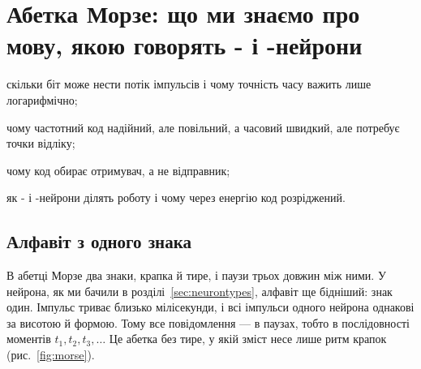 \chapter{Абетка Морзе: що ми знаємо про мову, якою говорять - і -нейрони}
\label{sec:code}
\begin{chaptergoals}
\item скільки біт може нести потік імпульсів і чому точність часу важить лише логарифмічно;
\item чому частотний код надійний, але повільний, а часовий швидкий, але потребує точки відліку;
\item чому код обирає отримувач, а не відправник;
\item як - і -нейрони ділять роботу і чому через енергію код розріджений.
\end{chaptergoals}

\section{Алфавіт з одного знака}

В абетці Морзе два знаки, крапка й тире, і паузи трьох довжин між ними. У нейрона, як ми бачили в розділі~\ref{sec:neurontypes}, алфавіт ще бідніший: знак один. Імпульс триває близько мілісекунди, і всі імпульси одного нейрона однакові за висотою й формою. Тому все повідомлення --- в паузах, тобто в послідовності моментів $t_1,t_2,t_3,\dots$ Це абетка без тире, у якій зміст несе лише ритм крапок (рис.~\ref{fig:morse}).

